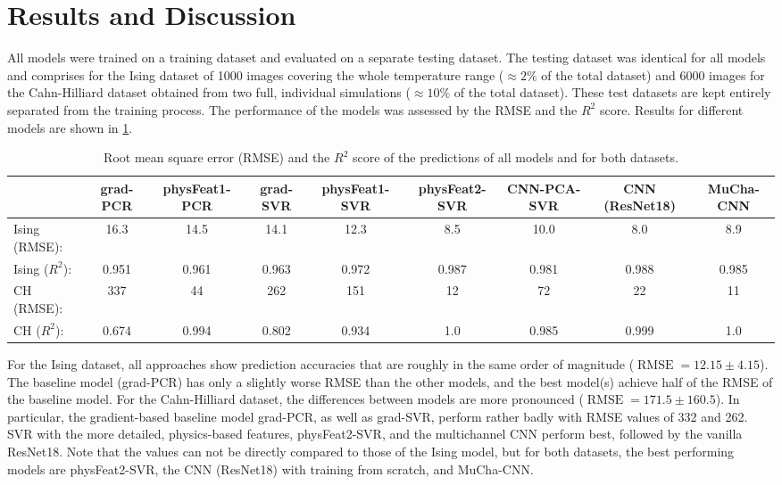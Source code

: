 \documentclass[11pt, authoryear]{elsarticle}
\renewcommand\textcolor[2]{#2}
\begin{document}
	\section{Results and Discussion}
	All models were trained on a training dataset and evaluated on a separate 
	testing dataset. The testing dataset was identical for all models and comprises 
	for the Ising dataset of 1000 images covering the whole temperature range 
	($\approx 2\%$ of the total dataset) and 
	6000 images for the Cahn-Hilliard dataset obtained from two full, individual
	simulations ($\approx 10\%$ of the total dataset). \textcolor{red}{These test 
		datasets are kept entirely separated from the training process.}
	The performance of the models was assessed by the \gls{RMSE} \textcolor{red}{and the $R^2$ score}. Results for 
	different models are shown in \cref{table:summary}. 
	\begin{table}[htb]
		\centering\small
		\begin{tabular}{p{2.1cm}c{0.9cm}c{1.4cm}c{0.9cm}c{1.45cm}c{1.45cm}c{1.45cm}c{1.25cm}c{1.25cm}}
			\hline\hline
			& grad-PCR & physFeat1-PCR & grad-SVR & physFeat1-SVR & physFeat2-SVR & CNN-PCA-SVR & CNN (ResNet18) & MuCha-CNN  \\
			\hline
			Ising (RMSE):         & 16.3 & 14.5 & 14.1 & 12.3 & 8.5 & 10.0 & 8.0 & 8.9  \\
			Ising ($R^2$):         & 0.951 & 0.961 & 0.963 & 0.972 & 0.987 & 0.981 & 0.988 & 0.985  \\
			CH (RMSE): & 337 & 44 & 262 & 151 & 12 & 72 & 22 & 11  \\
			CH ($R^2$): & 0.674 & 0.994 & 0.802 & 0.934 & 1.0 & 0.985 & 0.999 & 1.0  \\
			\hline\hline
		\end{tabular}
		\caption{%
			Root mean square error (RMSE) \textcolor{red}{and the $R^2$ score} of the predictions of all models 
			and for both datasets. 
		}
		\label{table:summary}
	\end{table}
	For the Ising dataset, all approaches show prediction accuracies that are 
	roughly in the same order of magnitude ($\operatorname{RMSE}= 12.15 \pm
	4.15$). The baseline model (grad-PCR) has only a slightly worse \gls{RMSE} 
	than the other models, and the best model(s) achieve half of the \gls{RMSE} 
	of the baseline model.
	For the Cahn-Hilliard dataset, the differences between models are more 
	pronounced ($\operatorname{RMSE}= 171.5 \pm 160.5$). In particular, the 
	gradient-based baseline model grad-PCR, as well as grad-SVR, perform rather 
	badly with RMSE values of 332 and 262. \Gls{SVR} with the more detailed, 
	physics-based features, physFeat2-SVR, and the multichannel CNN perform best, 
	followed by the vanilla ResNet18. Note that the values can not be directly 
	compared to those of the Ising model, but for both datasets, the best 
	performing models are physFeat2-SVR, the CNN (ResNet18) with training from 
	scratch, and MuCha-CNN.
	
\end{document}
